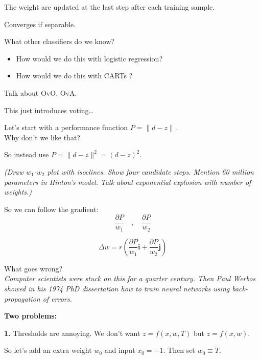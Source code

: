 The weight are updated at the last step after each training sample.

Converges if separable.



What other classifiers do we know?
\begin{itemize}
\item How would we do this with logistic regression?
\item How would we do this with CARTs ?
\end{itemize}

Talk about OvO, OvA.

This just introduces voting\dots



Let's start with a performance function $P=\| d-z \|$.  \\
Why don't we like that?

So instead use $P=\| d-z \|^2 = (d-z)^2$.

\textit{(Draw $w_1$-$w_2$ plot with isoclines.  Show four candidate
  steps.  Mention 60 million parameters in Hinton's model.  Talk about
  exponential explosion with number of weights.)}

So we can follow the gradient:
\begin{displaymath}
  \frac{\partial P}{w_1} \quad , \quad   \frac{\partial P}{w_2}
\end{displaymath}

\begin{displaymath}
  \Delta w = r\left( \frac{\partial P}{w_1} \mathbf{i} +
    \frac{\partial P}{w_2} \mathbf{j} \right)
\end{displaymath}

What goes wrong?\\

\textit{Computer scientists were stuck on this for a quarter century.
Then Paul Werbos showed in his 1974 PhD dissertation how to train
neural networks using back-propagation of errors.}

\textbf{Two problems:}

\textbf{\large 1. } Thresholds are annoying.  We don't want $z = f(x, w, T)$
but $z=f(x, w)$.

So let's add an extra weight $w_0$ and input $x_0=-1$.  Then set $w_0\equiv T$.

